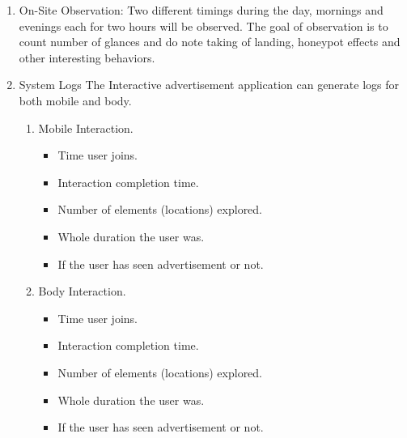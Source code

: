 \begin{enumerate}
\item On-Site Observation:
Two different timings during the day, mornings and evenings each for two hours will be observed. The goal of observation is to count number of glances and do note taking of landing, honeypot effects and other interesting behaviors. 
 
\item System Logs
The Interactive advertisement application can generate logs for both mobile and body.
\begin{enumerate}
\item	Mobile Interaction.
\begin{itemize}
\item	Time user joins.
\item	Interaction completion time.
\item	Number of elements (locations) explored.
\item	Whole duration the user was.
\item	If the user has seen advertisement or not.
\end{itemize}
\item	Body Interaction.
\begin{itemize}
\item	Time user joins.
\item	Interaction completion time.
\item	Number of elements (locations) explored.
\item	Whole duration the user was.
\item	If the user has seen advertisement or not.
\end{itemize}

\end{enumerate}
\end{enumerate}



















